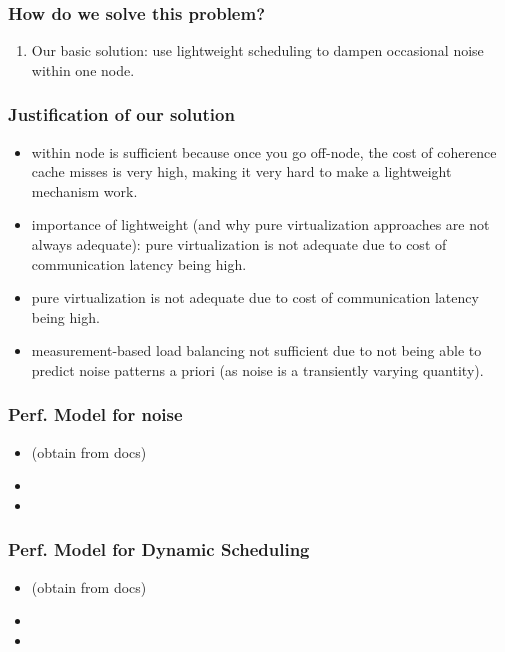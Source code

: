\begin{comment}
\begin{frame}
\frametitle{What we are trying (and not trying) to do } 
\begin{enumerate} 
\item  
\item 
\item 
\end{enumerate} 
\end{frame} 
\end{comment}

\begin{frame}
\frametitle{How do we solve this problem?} 
\begin{enumerate} 
\item \small Our basic solution: use lightweight scheduling to dampen
  occasional noise within one node. 
\end{enumerate} 
\end{frame} 

\begin{frame} 
\frametitle{Justification of our solution}
\begin{itemize} 
\item \small within node is sufficient because once you go off-node,
  the cost of coherence cache misses is very high, making it very hard
  to make a lightweight mechanism work. 
\item \small importance of lightweight (and why pure virtualization
  approaches are not always adequate): pure virtualization is not
  adequate due to cost of communication latency being high. 
\item \small pure virtualization is not adequate due to cost of
  communication latency being high. 
\item \small measurement-based load balancing not sufficient due to
  not being able to predict noise patterns a priori (as noise is a
  transiently varying quantity). 
\end{itemize}
\end{frame}


\begin{frame}
\frametitle{Perf. Model for noise}  
\begin{itemize} 
\item \small (obtain from docs)
\item 
\item 
\end{itemize}
\end{frame}


\begin{frame}
\frametitle{Perf. Model for Dynamic Scheduling}  
\begin{itemize} 
\item \small (obtain from docs)
\item 
\item 
\end{itemize}
\end{frame} 

